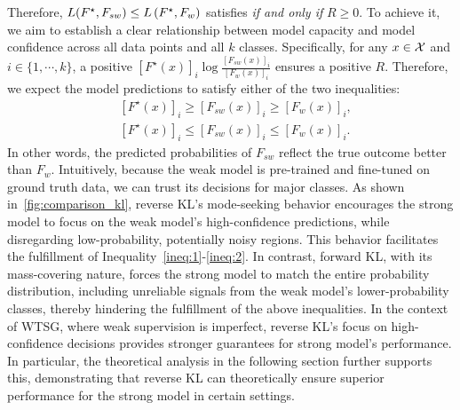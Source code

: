 Therefore, $L(F^\star, F_{sw}) \le L\left( F^\star, F_w \right)$ satisfies \textit{if and only if} $R \ge 0$.
To achieve it, we aim to establish a clear relationship between model capacity and model confidence across all data points and all $k$ classes.
Specifically, for any $x \in \mathcal{X}$ and $i \in \{ 1, \cdots, k  \}$, a positive $[F^\star(x)]_i \log{\frac{[F_{sw}(x)]_i}{[F_w(x)]_i}}$ ensures a positive $R$.
Therefore, we expect the model predictions to satisfy either of the two inequalities:
\begin{align}
    & [F^\star(x)]_i \ge [F_{sw}(x)]_i \ge [F_w(x)]_i, \label{ineq:1} \\ 
    & [F^\star(x)]_i \le [F_{sw}(x)]_i \le [F_w(x)]_i. \label{ineq:2}
\end{align}
In other words, the predicted probabilities of $F_{sw}$ reflect the true outcome better than $F_w$.
Intuitively, because the weak model is pre-trained and fine-tuned on ground truth data, we can trust its decisions for major classes.
As shown in~\cref{fig:comparison_kl}, reverse KL’s mode-seeking behavior encourages the strong model to focus on the weak model’s high-confidence predictions, while disregarding low-probability, potentially noisy regions. 
This behavior facilitates the fulfillment of Inequality~\eqref{ineq:1}-\eqref{ineq:2}. 
In contrast, forward KL, with its mass-covering nature, forces the strong model to match the entire probability distribution, including unreliable signals from the weak model’s lower-probability classes, thereby hindering the fulfillment of the above inequalities. 
In the context of WTSG, where weak supervision is imperfect, reverse KL’s focus on high-confidence decisions provides stronger guarantees for strong model's performance. 
In particular, the theoretical analysis in the following section further supports this, demonstrating that reverse KL can theoretically ensure superior performance for the strong model in certain settings.







